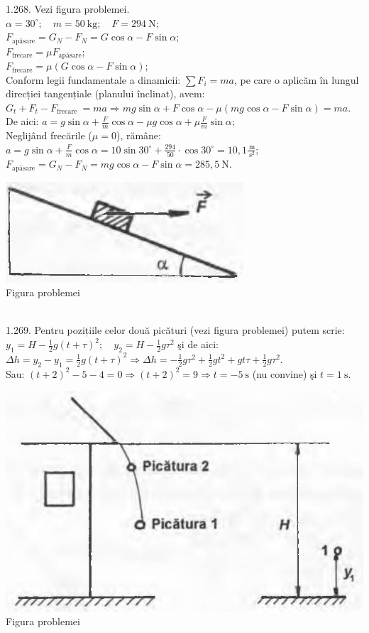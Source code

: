 1.268. Vezi figura problemei.\\ $\alpha=30^{\circ}; \quad m=50 \mathrm{~kg}; \quad F=294 \mathrm{~N}$;\\ $F_{\text {apăsare}}=G_{N}-F_{N}=G \cos \alpha-F \sin \alpha$;\\ $F_{\text {frecare}}=\mu F_{\text {apăsare}}$;\\ $F_{\text {frecare}}=\mu(G \cos \alpha-F \sin \alpha)$;\\ Conform legii fundamentale a dinamicii: $\sum F_{i}=m a$, pe care o aplicăm în lungul direcției tangențiale (planului înclinat), avem:\\ $G_{t}+F_{t}-F_{\text {frecare }}=m a \Rightarrow m g \sin \alpha+F \cos \alpha-\mu(m g \cos \alpha-F \sin \alpha)=m a$.\\ De aici: $a=g \sin \alpha+\frac{F}{m} \cos \alpha-\mu g \cos \alpha+\mu \frac{F}{m} \sin \alpha$;\\ Neglijând frecările ($\mu=0$), rămâne:\\ $a=g \sin \alpha+\frac{F}{m} \cos \alpha=10 \sin 30^{\circ}+\frac{294}{50} \cdot \cos 30^{\circ}=10,1 \frac{\mathrm{~m}}{\mathrm{~s}^{2}}$;\\ $F_{\text {apāsare}}=G_{N}-F_{N}=m g \cos \alpha-F \sin \alpha=285,5 \mathrm{~N}$.\\ \begin{center} \includegraphics[width=0.4\linewidth]{images/2025_07_01_5b3ff9fa0d508c8e9f17g-257(1)}\\ Figura problemei \end{center}\\

1.269. Pentru pozițiile celor două picături (vezi figura problemei) putem scrie:\\ $y_{1}=H-\frac{1}{2} g(t+\tau)^{2}; \quad y_{2}=H-\frac{1}{2} g \tau^{2}$ şi de aici:\\ $\Delta h=y_{2}-y_{1}=\frac{1}{2} g(t+\tau)^{2} \Rightarrow \Delta h=-\frac{1}{2} g \tau^{2}+\frac{1}{2} g t^{2}+g t \tau+\frac{1}{2} g \tau^{2}$.\\ Sau: $(t+2)^{2}-5-4=0 \Rightarrow(t+2)^{2}=9 \Rightarrow t=-5 \mathrm{~s}$ (nu convine) şi $t=1 \mathrm{~s}$.\\ \begin{center} \includegraphics[width=0.4\linewidth]{images/2025_07_01_5b3ff9fa0d508c8e9f17g-257}\\ Figura problemei \end{center}\\

